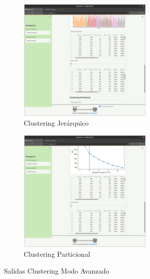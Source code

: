 \documentclass[10pt]{article}
\begin{document}
    \begin{figure}[H]
    
    \begin{subfigure}{0.5\textwidth}
    \centering
    \includegraphics[height=6cm]{img/ClusteringMA_J.png} 
    \caption{Clustering Jerárquico}
    \label{fig:ClusteringJ}
    \end{subfigure}
    \begin{subfigure}{0.5\textwidth}
    \centering
    \includegraphics[height=6cm]{img/ClusteringMA_P.png}
    \caption{Clustering Particional}
    \label{fig:ClustringP}
    \end{subfigure}
    
    \caption{Salidas Clustering Modo Avanzado}
    \label{fig:ClusteringMA}
    \end{figure}
    
\end{document}
